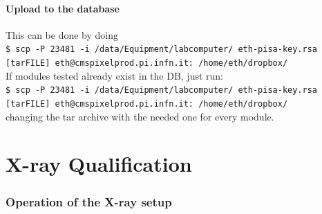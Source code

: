 \documentclass[fleqn,10pt]{SelfArx} %
\newcommand{\shellcmd}[1]{\\\indent\indent\texttt{\footnotesize\$ #1}\\}
\begin{document}
\subsection{Upload to the database}
This can be done by doing 
\shellcmd{scp -P 23481 -i /data/Equipment/labcomputer/ eth-pisa-key.rsa [tarFILE] eth@cmspixelprod.pi.infn.it: /home/eth/dropbox/}

If modules tested already exist in the DB, just run:
\shellcmd{scp -P 23481 -i /data/Equipment/labcomputer/ eth-pisa-key.rsa [tarFILE] eth@cmspixelprod.pi.infn.it: /home/eth/dropbox/}
changing the tar archive with the needed one for every module.

\part{X-ray Qualification}

\section{Operation of the X-ray setup}
\end{document}
